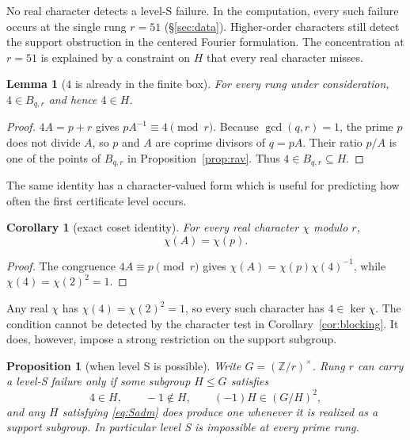 \documentclass[11pt]{article}
\newtheorem{lemma}[theorem]{Lemma}
\newtheorem{proposition}[theorem]{Proposition}
\newtheorem{corollary}[theorem]{Corollary}
\theoremstyle{definition}
\theoremstyle{remark}
\begin{document}
No real character detects a level-S failure. In the computation, every such failure
occurs at the single rung $r=51$ (\S\ref{sec:data}). Higher-order characters still
detect the support obstruction in the centered Fourier formulation. The concentration at $r=51$ is explained by a
constraint on $H$ that every real character misses.

\begin{lemma}[$4$ is already in the finite box]\label{lem:four}
For every rung under consideration, $4\in B_{q,r}$ and hence $4\in H$.
\end{lemma}

\begin{proof}
$4A=p+r$ gives $pA^{-1}\equiv4\pmod r$. Because $\gcd(q,r)=1$, the prime $p$
does not divide $A$, so $p$ and $A$ are coprime divisors of $q=pA$. Their ratio
$p/A$ is one of the points of
$B_{q,r}$ in Proposition~\ref{prop:rav}. Thus $4\in B_{q,r}\subseteq H$.
\end{proof}

The same identity has a character-valued form which is useful for predicting how
often the first certificate level occurs.

\begin{corollary}[exact coset identity]\label{cor:coset}
For every real character $\chi$ modulo $r$,
\[
\chi(A)=\chi(p).
\]
\end{corollary}

\begin{proof}
The congruence $4A\equiv p\pmod r$ gives
$\chi(A)=\chi(p)\chi(4)^{-1}$, while
$\chi(4)=\chi(2)^2=1$.
\end{proof}

Any real $\chi$ has $\chi(4) = \chi(2)^2 = 1$, so every such character has
$4\in\ker\chi$. The condition cannot be detected by the character test in
Corollary~\ref{cor:blocking}. It does,
however, impose a strong restriction on the support subgroup.

\begin{proposition}[when level S is possible]\label{prop:Spossible}
Write $G = (\mathbb{Z}/r)^\times$. Rung $r$ can carry a level-S failure only if some
subgroup $H \le G$ satisfies
\begin{equation}\label{eq:Sadm}
4 \in H, \qquad -1 \notin H, \qquad (-1)H \in (G/H)^2 ,
\end{equation}
and any $H$ satisfying \eqref{eq:Sadm} does produce one whenever it is realized as a
support subgroup. In particular level S is impossible at every prime rung.
\end{proposition}
\end{document}
